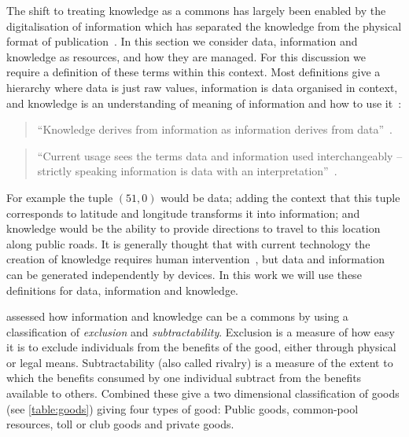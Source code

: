 The shift to treating knowledge as a commons has largely been enabled by the digitalisation of information which has separated the knowledge from the physical format of publication~\citep{Ostrom2003}. 
In this section we consider data, information and knowledge as resources, and how they are managed. 
For this discussion we require a definition of these terms within this context.
Most definitions give a hierarchy where data is just raw values, information is data organised in context, and knowledge is an understanding of meaning of information and how to use it~\citep{Machlup1983}:

\begin{quote}
``Knowledge derives from information as information derives from data''~\citep[p.6]{Davenport2000}.
\end{quote}
\begin{quote}
``Current usage sees the terms data and information used interchangeably -- strictly speaking information is
data with an interpretation''~\citep[p.203]{Shadbolt2013}.
\end{quote}

For example the tuple $(51,0)$ would be data; adding the context that this tuple corresponds to latitude and longitude transforms it into information; and knowledge would be the ability to provide directions to travel to this location along public roads. It is generally thought that with current technology the creation of knowledge requires human intervention~\citep{Davenport2000}, but data and information can be generated independently by devices. In this work we will use these definitions for data, information and knowledge.

\citet{Ostrom2003} assessed how information and knowledge can be a commons by using a classification of \emph{exclusion} and \emph{subtractability}. 
Exclusion is a measure of how easy it is to exclude individuals from the benefits of the good, either through physical or legal means. 
Subtractability (also called rivalry) is a measure of the extent to which the benefits consumed by one individual subtract from the benefits available to others. 
Combined these give a two dimensional classification of goods (see \autoref{table:goods}) giving four types of good: Public goods, common-pool resources, toll or club goods and private goods.

